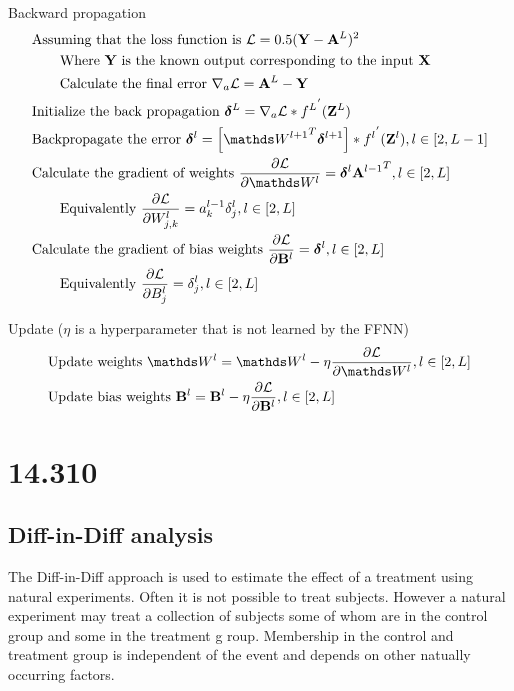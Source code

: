 Backward propagation
\begin {equation} \begin {split}
& \text {Assuming that the loss function is } \cL = 0.5 (\vY - \vA^L)^2 \\
& \qquad \text {Where $\vY$ is the known output corresponding to the input $\vX$} \\
& \qquad \text {Calculate the final error } \nabla_a \cL =  \vA^L - \vY \\
& \text {Initialize  the back propagation } \vdelta^L =  \ewise {\nabla_a \cL} {{f^L}^{'} (\vZ^L)} \\
& \text {Backpropagate the error } \vdelta^l =  \ewise {\left[ {\mW^{l+1}}^T \vdelta^{l+1} \right]} {{f^{l}}^{'} (\vZ^l)}, l \in [2, L-1] \\
& \text {Calculate the gradient of weights } \frac {\partial \cL} {\partial \mW^l} = \vdelta^l {\vA^{l-1}}^T, l \in [2, L] \\
& \qquad \text {Equivalently } \frac {\partial \cL} {\partial W_{j,k}^l} = a_k^{l-1} \delta_j^l, l \in [2, L] \\
& \text {Calculate the gradient of bias weights } \frac {\partial \cL} {\partial \vB^l} = \vdelta^l, l \in [2, L] \\
& \qquad \text {Equivalently } \frac {\partial \cL} {\partial B_j^l} = \delta_j^l, l \in [2, L] \\
\end {split} \end {equation}

Update ($\eta$ is a hyperparameter that is not learned by the FFNN)
\begin {equation} \begin {split}
& \text {Update weights } \mW^l = \mW^l - \eta \frac {\partial \cL} {\partial \mW^l}, l \in [2, L] \\
& \text {Update bias weights } \vB^l = \vB^l - \eta \frac {\partial \cL} {\partial \vB^l}, l \in [2, L] \\
\end {split} \end {equation}

\section {14.310}
\subsection {Diff-in-Diff analysis}
The Diff-in-Diff approach is used to estimate the effect of a treatment using natural experiments. Often it is not possible to treat subjects. However a natural experiment may treat a collection of subjects some of whom are in the control group and some in the treatment g
roup. Membership in the control and treatment group is independent of the event and depends on other natually occurring factors.

